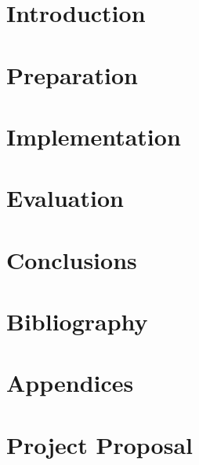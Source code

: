 \documentclass[12pt,twoside,notitlepage]{report}
\begin{document}

\cleardoublepage        %

\setcounter{page}{1}
\pagestyle{headings}

\chapter{Introduction}

\chapter{Preparation}

\chapter{Implementation}

\chapter{Evaluation}

\chapter{Conclusions}

\chapter{Bibliography}

\chapter{Appendices}

\chapter{Project Proposal}

\end{document}
